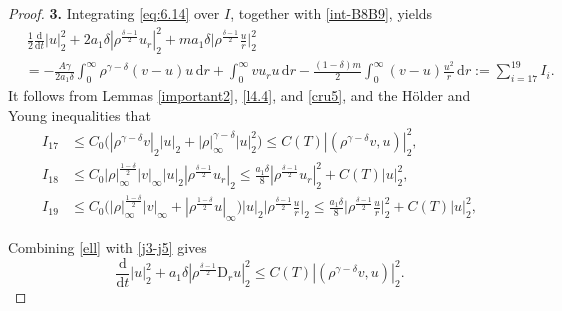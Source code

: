 \documentclass[11pt,reqno]{amsart}
\numberwithin{rk}{section}
\numberwithin{prop}{section}
\numberwithin{mydef}{section}
\numberwithin{lem}{section}
\numberwithin{equation}{section}
\numberwithin{thm}{section}
\begin{document}
\begin{proof}
\smallskip
\textbf{3.} Integrating \eqref{eq:6.14} over $I$, together with \eqref{int-B8B9}, yields
\begin{equation}\label{ell}
\begin{aligned}
&\,\frac{1}{2}\frac{\mathrm{d}}{\mathrm{d}t}|u|_2^2+ 2a_1\delta|\rho^\frac{\delta-1}{2}u_r|_2^2+ma_1\delta\Big|\rho^\frac{\delta-1}{2}\frac{u}{r}\Big|_2^2\\
&=-\frac{A\gamma}{2a_1\delta}\int_0^\infty \rho^{\gamma-\delta}(v-u) u\,\mathrm{d}r+ \int_0^\infty v u_ru \,\mathrm{d}r-\frac{(1-\delta)m}{2}\int_0^\infty\! (v-u)\frac{u^2}{r}\,\mathrm{d}r :=\sum_{i=17}^{19} I_i.
\end{aligned}
\end{equation}
It follows from Lemmas \ref{important2}, \ref{l4.4}, and \ref{cru5}, and the H\"older and Young inequalities that 
\begin{equation}\label{j3-j5}
\begin{aligned}
I_{17}&\leq C_0\big(|\rho^{\gamma-\delta} v|_2|u|_2 +|\rho|_\infty^{\gamma-\delta} |u|_2^2\big) \leq  C(T)|(\rho^{\gamma-\delta} v,u)|_2^2,\\
I_{18}&\leq C_0|\rho|_\infty^\frac{1-\delta}{2}|v|_\infty|u|_2 |\rho^\frac{\delta-1}{2}u_r|_2 \leq \frac{a_1\delta}{8}|\rho^\frac{\delta-1}{2}u_r|_2^2+C(T)|u|_2^2,\\
I_{19}&\leq C_0\big(|\rho|_\infty^\frac{1-\delta}{2}|v|_\infty+|\rho^\frac{1-\delta}{2}u|_\infty\big)|u|_2 \Big|\rho^\frac{\delta-1}{2}\frac{u}{r}\Big|_2\leq \frac{a_1\delta}{8}\Big|\rho^\frac{\delta-1}{2}\frac{u}{r}\Big|_2^2+C(T)|u|_2^2, 
\end{aligned}
\end{equation}

Combining \eqref{ell} with \eqref{j3-j5} gives
\begin{equation}\label{pol}
\frac{\mathrm{d}}{\mathrm{d}t}|u|_2^2+ a_1\delta |\rho^\frac{\delta-1}{2}\mathrm{D}_r u|_2^2\leq  C(T)|(\rho^{\gamma-\delta} v,u)|_2^2. 
\end{equation}


\end{proof}
\end{document}
